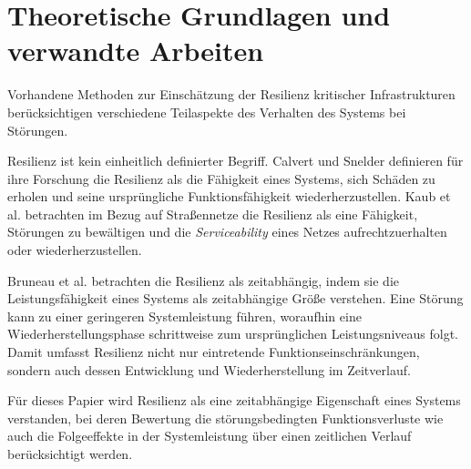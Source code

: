 

\section{Theoretische Grundlagen und verwandte Arbeiten}
\label{sec:related_works}




%




Vorhandene Methoden zur Einschätzung der Resilienz kritischer Infrastrukturen berücksichtigen verschiedene Teilaspekte des Verhalten des Systems bei Störungen\cite{berdica2002,calvert2017,kaub2024,lickert2024}.



Resilienz ist kein einheitlich definierter Begriff. Calvert und Snelder definieren für ihre Forschung die Resilienz als die Fähigkeit eines Systems, sich Schäden zu erholen und seine ursprüngliche Funktionsfähigkeit wiederherzustellen\cite{calvert2017}. Kaub et al. betrachten im Bezug auf Straßennetze die Resilienz als eine Fähigkeit, Störungen zu bewältigen und die \textit{Serviceability} eines Netzes aufrechtzuerhalten oder wiederherzustellen\cite{kaub2024}.

Bruneau et al. betrachten die Resilienz als zeitabhängig, indem sie die Leistungsfähigkeit eines Systems als zeitabhängige Größe verstehen\cite{bruneau2003}. Eine Störung kann zu einer geringeren Systemleistung führen, woraufhin eine Wiederherstellungsphase schrittweise zum ursprünglichen Leistungsniveaus folgt\cite{bruneau2003}. Damit umfasst Resilienz nicht nur eintretende Funktionseinschränkungen, sondern auch dessen Entwicklung und Wiederherstellung im Zeitverlauf\cite{bruneau2003}.

Für dieses Papier wird Resilienz als eine zeitabhängige Eigenschaft eines Systems verstanden, bei deren Bewertung die störungsbedingten Funktionsverluste wie auch die Folgeeffekte in der Systemleistung über einen zeitlichen Verlauf berücksichtigt werden.

